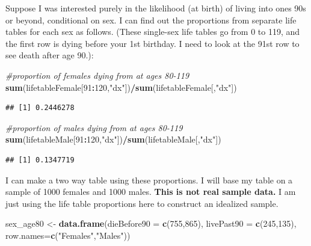 \documentclass[openany]{book}
\newenvironment{Shaded}{\begin{snugshade}}{\end{snugshade}}
\newcommand{\CommentTok}[1]{\textcolor[rgb]{0.56,0.35,0.01}{\textit{#1}}}
\newcommand{\DataTypeTok}[1]{\textcolor[rgb]{0.13,0.29,0.53}{#1}}
\newcommand{\DecValTok}[1]{\textcolor[rgb]{0.00,0.00,0.81}{#1}}
\newcommand{\KeywordTok}[1]{\textcolor[rgb]{0.13,0.29,0.53}{\textbf{#1}}}
\newcommand{\NormalTok}[1]{#1}
\newcommand{\OperatorTok}[1]{\textcolor[rgb]{0.81,0.36,0.00}{\textbf{#1}}}
\newcommand{\StringTok}[1]{\textcolor[rgb]{0.31,0.60,0.02}{#1}}
\begin{document}
Suppose I was interested purely in the likelihood (at birth) of living into ones 90s or beyond, conditional on sex. I can find out the proportions from separate life tables for each sex as follows. (These single-sex life tables go from 0 to 119, and the first row is dying before your 1st birthday. I need to look at the 91st row to see death after age 90.):

\begin{Shaded}
\begin{Highlighting}[]
\CommentTok{#proportion of females dying from at ages 80-119}
\KeywordTok{sum}\NormalTok{(lifetableFemale[}\DecValTok{91}\OperatorTok{:}\DecValTok{120}\NormalTok{,}\StringTok{"dx"}\NormalTok{])}\OperatorTok{/}\KeywordTok{sum}\NormalTok{(lifetableFemale[,}\StringTok{"dx"}\NormalTok{])}
\end{Highlighting}
\end{Shaded}

\begin{verbatim}
## [1] 0.2446278
\end{verbatim}

\begin{Shaded}
\begin{Highlighting}[]
\CommentTok{#proportion of males dying from at ages 80-119}
\KeywordTok{sum}\NormalTok{(lifetableMale[}\DecValTok{91}\OperatorTok{:}\DecValTok{120}\NormalTok{,}\StringTok{"dx"}\NormalTok{])}\OperatorTok{/}\KeywordTok{sum}\NormalTok{(lifetableMale[,}\StringTok{"dx"}\NormalTok{])}
\end{Highlighting}
\end{Shaded}

\begin{verbatim}
## [1] 0.1347719
\end{verbatim}

I can make a two way table using these proportions. I will base my table on a sample of 1000 females and 1000 males. \textbf{This is not real sample data.} I am just using the life table proportions here to construct an idealized sample.

\begin{Shaded}
\begin{Highlighting}[]
\NormalTok{sex_age80 <-}\StringTok{ }\KeywordTok{data.frame}\NormalTok{(}\DataTypeTok{dieBefore90 =} \KeywordTok{c}\NormalTok{(}\DecValTok{755}\NormalTok{,}\DecValTok{865}\NormalTok{), }\DataTypeTok{livePast90 =} \KeywordTok{c}\NormalTok{(}\DecValTok{245}\NormalTok{,}\DecValTok{135}\NormalTok{), }
                        \DataTypeTok{row.names=}\KeywordTok{c}\NormalTok{(}\StringTok{"Females"}\NormalTok{,}\StringTok{"Males"}\NormalTok{))}
\end{Highlighting}
\end{Shaded}
\end{document}
